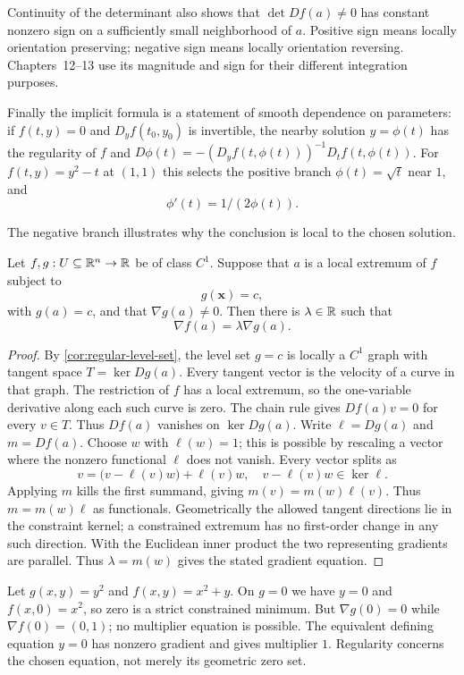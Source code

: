 Continuity of the determinant also shows that $\det Df(a)\ne0$ has
constant nonzero sign on a sufficiently small neighborhood of $a$.
Positive sign means locally orientation preserving; negative sign means
locally orientation reversing. Chapters~12--13 use its magnitude and sign
for their different integration purposes.

Finally the implicit formula is a statement of smooth dependence on
parameters: if $f(t,y)=0$ and $D_yf(t_0,y_0)$ is invertible, the nearby
solution $y=\phi(t)$ has the regularity of $f$ and
$D\phi(t)=-(D_yf(t,\phi(t)))^{-1}D_tf(t,\phi(t))$.
For $f(t,y)=y^2-t$ at $(1,1)$ this selects the positive branch
$\phi(t)=\sqrt t$ near $1$, and
\[
\phi'(t)=1/(2\phi(t)).
\]

The negative branch illustrates why the conclusion is local to the chosen solution.


\begin{theorem}
\label{thm:lagrange-multipliers}
Let $f,g:U\subseteq\mathbb{R}^n\to\mathbb{R}$ be of class $C^1$.  Suppose that $a$ is a
local extremum of $f$ subject to
\[
g(\mathbf{x})=c,
\]
with $g(a)=c$, and that $\nabla g(a)\ne0$.  Then there is $\lambda\in\mathbb{R}$ such that
\[
\nabla f(a)=\lambda\nabla g(a).
\]
\end{theorem}
\begin{proof}
By \cref{cor:regular-level-set}, the level set $g=c$ is locally a
$C^1$ graph with tangent space $T=\ker Dg(a)$. Every tangent vector
is the velocity of a curve in that graph. The restriction of $f$ has
a local extremum, so the one-variable derivative along each such curve
is zero. The chain rule gives $Df(a)v=0$ for every $v\in T$.
Thus $Df(a)$ vanishes on $\ker Dg(a)$. Write $\ell=Dg(a)$ and $m=Df(a)$.
Choose $w$ with $\ell(w)=1$; this is possible by rescaling a vector
where the nonzero functional $\ell$ does not vanish. Every vector splits as
\[
v=\bigl(v-\ell(v)w\bigr)+\ell(v)w,
\quad v-\ell(v)w\in\ker\ell.
\]
Applying $m$ kills the first summand, giving $m(v)=m(w)\ell(v)$.
Thus $m=m(w)\ell$ as functionals. Geometrically the allowed tangent
directions lie in the constraint kernel; a constrained extremum has no
first-order change in any such direction. With the Euclidean inner
product the two representing gradients are parallel.
Thus $\lambda=m(w)$ gives the stated gradient equation.
\end{proof}

\begin{example}
Let $g(x,y)=y^2$ and $f(x,y)=x^2+y$. On $g=0$ we have $y=0$ and
$f(x,0)=x^2$, so zero is a strict constrained minimum. But
$\nabla g(0)=0$ while $\nabla f(0)=(0,1)$; no multiplier equation is
possible. The equivalent defining equation $y=0$ has nonzero gradient
and gives multiplier $1$. Regularity concerns the chosen equation,
not merely its geometric zero set.
\end{example}

